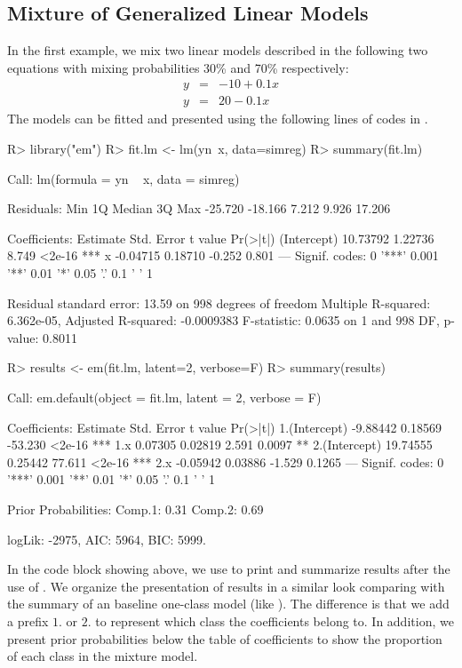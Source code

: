 \documentclass[nojss]{jss}
\begin{document}
   \subsection{Mixture of Generalized Linear Models}
   In the first example, we mix two linear models described in the following two equations with mixing probabilities 30\% and 70\% respectively:
   \begin{eqnarray}
   y &=& {-10} + 0.1 x \\
   y &=& 20 - 0.1 x
   \end{eqnarray}
  The models can be fitted and presented using the following lines of codes in .
\begin{Schunk}
\begin{Sinput}
R> library("em")
R> fit.lm <- lm(yn~x, data=simreg)
R> summary(fit.lm)
\end{Sinput}
\begin{Soutput}
Call:
lm(formula = yn ~ x, data = simreg)

Residuals:
    Min      1Q  Median      3Q     Max 
-25.720 -18.166   7.212   9.926  17.206 

Coefficients:
            Estimate Std. Error t value Pr(>|t|)    
(Intercept) 10.73792    1.22736   8.749   <2e-16 ***
x           -0.04715    0.18710  -0.252    0.801    
---
Signif. codes:  0 '***' 0.001 '**' 0.01 '*' 0.05 '.' 0.1 ' ' 1

Residual standard error: 13.59 on 998 degrees of freedom
Multiple R-squared:  6.362e-05,	Adjusted R-squared:  -0.0009383 
F-statistic: 0.0635 on 1 and 998 DF,  p-value: 0.8011
\end{Soutput}
\begin{Sinput}
R> results <- em(fit.lm, latent=2, verbose=F)
R> summary(results)
\end{Sinput}
\begin{Soutput}
Call:
em.default(object = fit.lm, latent = 2, verbose = F)

Coefficients: 
              Estimate Std. Error t value Pr(>|t|)    
1.(Intercept) -9.88442    0.18569 -53.230   <2e-16 ***
1.x            0.07305    0.02819   2.591   0.0097 ** 
2.(Intercept) 19.74555    0.25442  77.611   <2e-16 ***
2.x           -0.05942    0.03886  -1.529   0.1265    
---
Signif. codes:  0 '***' 0.001 '**' 0.01 '*' 0.05 '.' 0.1 ' ' 1

Prior Probabilities: 
Comp.1: 0.31
Comp.2: 0.69


logLik: -2975, AIC: 5964, BIC: 5999. 
\end{Soutput}
\end{Schunk}
  In the code block showing above, we use  to print and summarize results after the use of . We organize the presentation of results in a similar look comparing with the summary of an baseline one-class model (like ). The difference is that we add a prefix $1.$ or $2.$ to represent which class the coefficients belong to. In addition, we present prior probabilities below the table of coefficients to show the proportion of each class in the mixture model.
  
\end{document}
